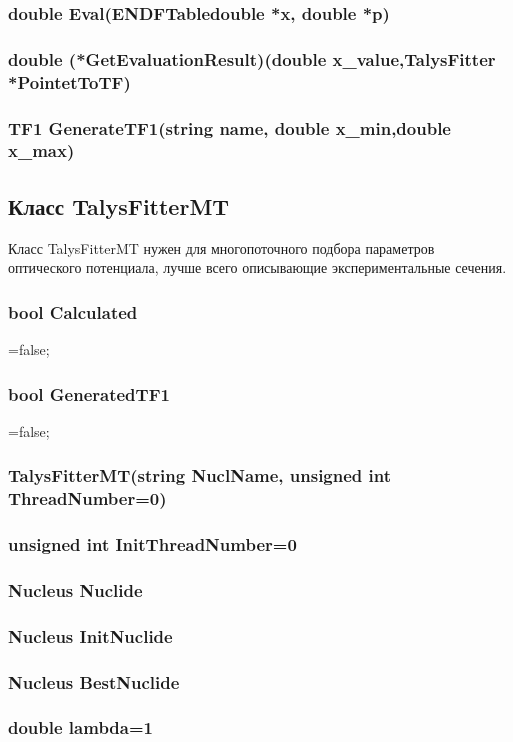 \documentclass[a4paper,12pt]{extarticle}
\begin{document}
\subsubsection{double Eval(ENDFTabledouble *x, double *p)}
\subsubsection{double (*GetEvaluationResult)(double x_value,TalysFitter *PointetToTF)}
\subsubsection{TF1 GenerateTF1(string name, double x_min,double x_max)}

\subsection{Класс TalysFitterMT}
Класс TalysFitterMT нужен для многопоточного подбора параметров оптического потенциала, лучше всего описывающие экспериментальные сечения. 

\subsubsection{bool Calculated}
=false;
\subsubsection{bool GeneratedTF1}
=false;
\subsubsection{TalysFitterMT(string NuclName, unsigned int ThreadNumber=0)}
\subsubsection{unsigned int InitThreadNumber=0}
\subsubsection{Nucleus Nuclide}
\subsubsection{Nucleus InitNuclide}
\subsubsection{Nucleus BestNuclide}
\subsubsection{double lambda=1}
\end{document}
